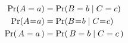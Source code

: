 \documentclass{article}
\newcommand\myeq{\mkern1mu{=}\mkern1mu}
\begin{document}
\begin{align*}
\Pr(A=a)       &= \Pr(B=b \mid C=c) \\           %
\Pr(A\myeq a)  &= \Pr(B\myeq b \mid C\myeq c) \\ %
\Pr(\, A=a \,) &= \Pr(\, B=b \mid C=c \,)        %
\end{align*}
\end{document}
